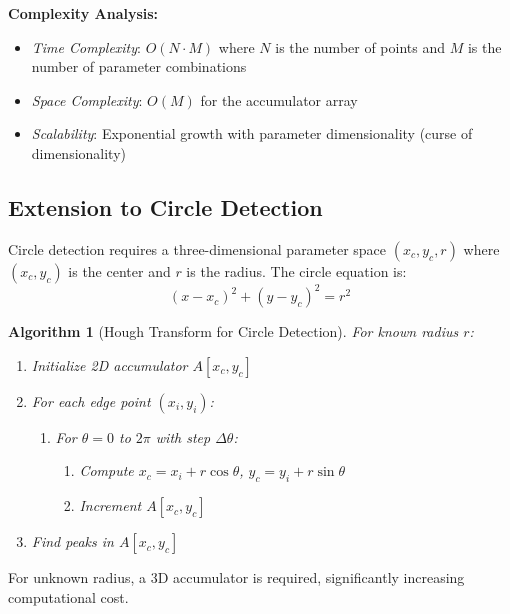 \documentclass[12pt]{article}
\newtheorem{algorithm}[theorem]{Algorithm}
\begin{document}
\textbf{Complexity Analysis:}
\begin{itemize}
    \item \textit{Time Complexity}: $O(N \cdot M)$ where $N$ is the number of points and $M$ is the number of parameter combinations
    \item \textit{Space Complexity}: $O(M)$ for the accumulator array
    \item \textit{Scalability}: Exponential growth with parameter dimensionality (curse of dimensionality)
\end{itemize}

\subsection{Extension to Circle Detection}
\label{subsec:hough_circles}

Circle detection requires a three-dimensional parameter space $(x_c, y_c, r)$ where $(x_c, y_c)$ is the center and $r$ is the radius. The circle equation is:
\begin{equation}
    (x - x_c)^2 + (y - y_c)^2 = r^2
    \label{eq:circle_equation}
\end{equation}

\begin{algorithm}[Hough Transform for Circle Detection]
    \label{alg:hough_circles}
    For known radius $r$:
    \begin{enumerate}
        \item Initialize 2D accumulator $A[x_c, y_c]$
        \item For each edge point $(x_i, y_i)$:
              \begin{enumerate}
                  \item For $\theta = 0$ to $2\pi$ with step $\Delta\theta$:
                        \begin{enumerate}
                            \item Compute $x_c = x_i + r \cos \theta$, $y_c = y_i + r \sin \theta$
                            \item Increment $A[x_c, y_c]$
                        \end{enumerate}
              \end{enumerate}
        \item Find peaks in $A[x_c, y_c]$
    \end{enumerate}
\end{algorithm}

For unknown radius, a 3D accumulator is required, significantly increasing computational cost.
\end{document}

